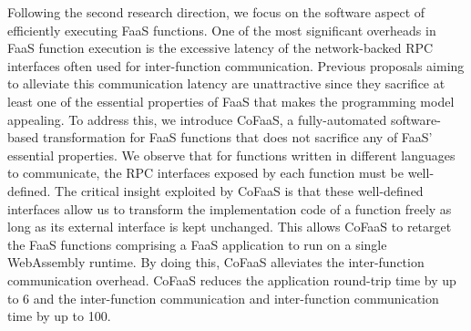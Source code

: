 \documentclass[../main.tex]{subfiles}
\begin{document}
Following the second research direction, we focus on the software
aspect of efficiently executing FaaS functions. One of the most
significant overheads in FaaS function execution is the excessive
latency of the network-backed RPC interfaces often used for
inter-function communication. Previous proposals aiming to alleviate
this communication latency are unattractive since they sacrifice at
least one of the essential properties of FaaS that makes the
programming model appealing. To address this, we introduce CoFaaS, a
fully-automated software-based transformation for FaaS functions that
does not sacrifice any of FaaS' essential properties. We observe that
for functions written in different languages to communicate, the RPC
interfaces exposed by each function must be well-defined. The critical
insight exploited by CoFaaS is that these well-defined interfaces
allow us to transform the implementation code of a function freely as
long as its external interface is kept unchanged. This allows CoFaaS
to retarget the FaaS functions comprising a FaaS application to run on
a single WebAssembly runtime. By doing this, CoFaaS alleviates the
inter-function communication overhead. CoFaaS reduces the application
round-trip time by up to 6\texttimes{} and the inter-function
communication and inter-function communication time by up to
100\texttimes{}.
\end{document}
